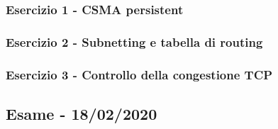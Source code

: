 \documentclass[a4paper]{article}
\begin{document}
	\subsubsection{Esercizio 1 - CSMA persistent}
	
	\subsubsection{Esercizio 2 - Subnetting e tabella di routing}
	
	\subsubsection{Esercizio 3 - Controllo della congestione TCP}
	
	\newpage

	\subsection[\textbf{Esame - 18/02/2020}]{Esame - 18/02/2020}
	
\end{document}
